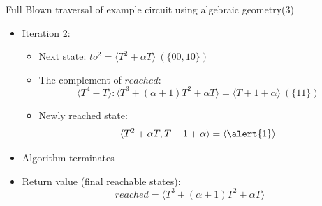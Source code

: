 \documentclass[xcolor=dvipsnames]{beamer}
\newcommand{\bi}{\begin{itemize}}
\newcommand{\ei}{\end{itemize}}
\begin{document}
\begin{frame}[label = pptpage3]{\large{Full Blown traversal of example circuit using algebraic geometry(3)}}
\bi
\item Iteration 2:
	\bi
	\item Next state: $to^2 = \langle T^2+\alpha T\rangle~(\{00,10\})$
	\item The complement of $reached$:
	$$\langle T^4-T\rangle:\langle T^3+(\alpha+1)T^2+\alpha T\rangle
= \langle T + 1+\alpha\rangle ~(\{11\})$$ 
	\item Newly reached state: 
$$\langle T^2+\alpha T, T+1+\alpha \rangle = \langle \alert{1}\rangle$$ 
	\ei
\item Algorithm terminates
\item Return value (final reachable states):
$$reached = \langle T^3+(\alpha+1)T^2+\alpha T\rangle$$
\ei
\hyperlink{pptalg}{}
\end{frame}
\end{document}
